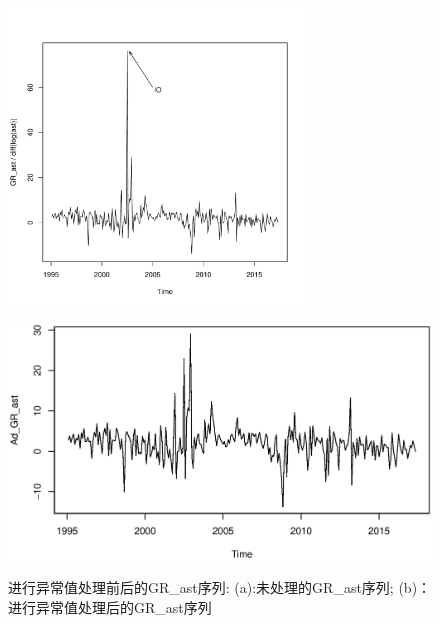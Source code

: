 \begin{figure}[h!]
	\begin{minipage}[ht]{0.48\textwidth}
		\centering
		\includegraphics[width=0.7\textwidth]{pic/ast/unnamed-chunk-1-6}
		\subcaption{}\label{io}
	\end{minipage}%
	\hspace{0.04\textwidth}
	\begin{minipage}[ht]{0.48\textwidth}
		\centering
		\includegraphics[width=\textwidth]{pic/ast/adgrast}
		\subcaption{}\label{ad}
	\end{minipage}
	\caption{进行异常值处理前后的GR\_ast序列: (a):未处理的GR\_ast序列; (b)：进行异常值处理后的GR\_ast序列}\label{ioad}
\end{figure}






